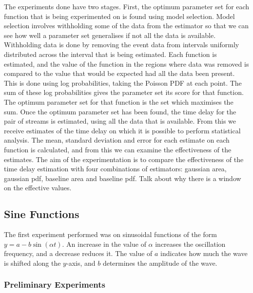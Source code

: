 \documentclass[a4paper,11pt]{article}
\begin{document}
The experiments done have two stages. First, the optimum parameter set for each
function that is being experimented on is found using model selection. Model
selection involves withholding some of the data from the estimator so that we
can see how well a parameter set generalises if not all the data is
available. Withholding data is done by removing the event data from intervals
uniformly distributed across the interval that is being estimated. Each function
is estimated, and the value of the function in the regions where data was
removed is compared to the value that would be expected had all the data been
present. This is done using log probabilities, taking the Poisson PDF at each
point. The sum of these log probabilities gives the parameter set its score for
that function. The optimum parameter set for that function is the set which
maximises the sum. Once the optimum parameter set has been found, the time delay
for the pair of streams is estimated, using all the data that is available. From
this we receive estimates of the time delay on which it is possible to perform
statistical analysis. The mean, standard deviation and error for each estimate
on each function is calculated, and from this we can examine the effectiveness
of the estimates. The aim of the experimentation is to compare the effectiveness
of the time delay estimation with four combinations of estimators: gaussian
area, gaussian pdf, baseline area and baseline pdf.
Talk about why there is a window on the effective values.
\subsection{Sine Functions}
\label{sec-7-1}

The first experiment performed was on sinusoidal functions of the form
$y=a-b\sin(\alpha t)$. An increase in the value of $\alpha$ increases the
oscillation frequency, and a decrease reduces it. The value of $a$ indicates how
much the wave is shifted along the $y$-axis, and $b$ determines the
amplitude of the wave.
\subsubsection{Preliminary Experiments}
\label{sec-7-1-1}
\end{document}
